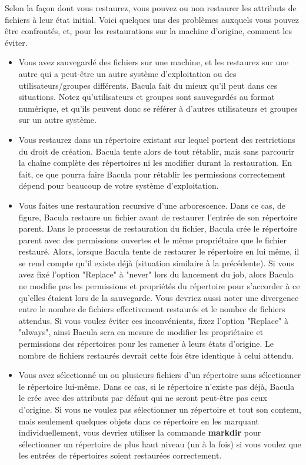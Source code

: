 Selon la fa\c{c}on dont vous restaurez, vous pouvez ou non restaurer les 
attributs de fichiers \`a leur \'etat initial. Voici quelques uns des 
probl\`emes auxquels vous pouvez \^etre confront\'es, et, pour les 
restaurations sur la machine d'origine, comment les \'eviter.

\begin{itemize}
\item Vous avez sauvegard\'e des fichiers sur une machine, et les restaurez
   sur une autre qui a peut-\^etre un autre syst\`eme d'exploitation ou des 
   utilisateurs/groupes diff\'erents. Bacula fait du mieux qu'il peut dans ces 
   situations. Notez qu'utilisateurs et groupes sont sauvegard\'es au format 
   num\'erique, et qu'ils peuvent donc se r\'ef\'erer \`a d'autres utilisateurs et 
   groupes sur un autre syst\`eme.
\item Vous restaurez dans un r\'epertoire existant sur lequel portent des 
   restrictions du droit de cr\'eation. Bacula tente alors de tout r\'etablir, 
   mais sans parcourir la cha\^ine compl\`ete des r\'epertoires ni les modifier 
   durant la restauration. En fait, ce que pourra faire Bacula pour r\'etablir 
   les permissions correctement d\'epend pour beaucoup de votre syst\`eme 
   d'exploitation.
\item Vous faites une restauration recursive d'une arborescence. Dans ce cas, 
   de figure, Bacula restaure un fichier avant de restaurer l'entr\'ee de son 
   r\'epertoire parent. Dans le processus de restauration du fichier, Bacula 
   cr\'ee le r\'epertoire parent avec des permissions ouvertes et le m\^eme 
   propri\'etaire que le fichier restaur\'e. Alors, lorsque Bacula tente de restaurer 
   le r\'epertoire en lui m\^eme, il se rend compte qu'il existe d\'ej\`a (situation 
   similaire \`a la pr\'ec\'edente). Si vous avez fix\'e l'option "Replace" \`a "never" 
   lors du lancement du job, alors Bacula ne modifie pas les permissions et 
   propri\'et\'es du r\'epertoire pour s'accorder \`a ce qu'elles \'etaient lors de la 
   sauvegarde. Vous devriez aussi noter une divergence entre le nombre de fichiers 
   effectivement restaur\'es et le nombre de fichiers attendus. Si vous voulez 
   \'eviter ces inconv\'enients, fixez l'option "Replace" \`a "always", ainsi 
   Bacula sera en mesure de modifier les propri\'etaire et permissions des 
   r\'epertoires pour les ramener \`a leurs \'etats d'origine. Le nombre de 
   fichiers restaur\'es devrait cette fois \^etre identique \`a celui attendu.

\item Vous avez s\'electionn\'e un ou plusieurs fichiers d'un r\'epertoire sans 
   s\'electionner le r\'epertoire lui-m\^eme. Dans ce cas, si le r\'epertoire 
   n'existe pas d\'ej\`a, Bacula le cr\'ee avec des attributs par d\'efaut qui ne 
   seront peut-\^etre pas ceux d'origine. Si vous ne voulez pas s\'electionner 
   un r\'epertoire et tout son contenu, mais seulement quelques objets dans 
   ce r\'epertoire en les marquant individuellement, vous devriez utiliser 
   la commande {\bf markdir} pour s\'electionner un r\'epertoire de plus haut 
   niveau (un \`a la fois) si vous voulez que les entr\'ees de r\'epertoires 
   soient restaur\'ees correctement.
\end{itemize}

